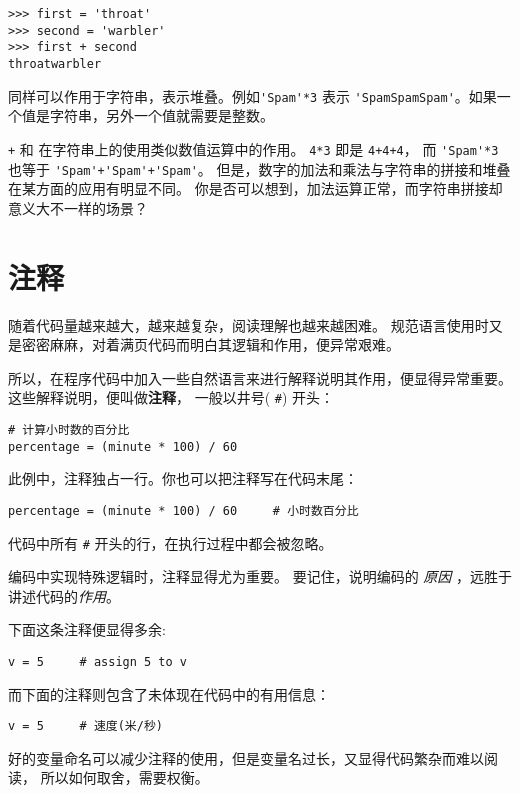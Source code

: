 \documentclass[10pt]{book}
\begin{document}
\begin{verbatim}
>>> first = 'throat'
>>> second = 'warbler'
>>> first + second
throatwarbler
\end{verbatim}
%
 {\tt *} 同样可以作用于字符串，表示堆叠。例如\verb"'Spam'*3" 表示
\verb"'SpamSpamSpam'"。如果一个值是字符串，另外一个值就需要是整数。

{\tt +} 和 {\tt *}在字符串上的使用类似数值运算中的作用。
 {\tt 4*3} 即是 {\tt 4+4+4}，
而 \verb"'Spam'*3"  也等于 \verb"'Spam'+'Spam'+'Spam'"。
但是，数字的加法和乘法与字符串的拼接和堆叠在某方面的应用有明显不同。
你是否可以想到，加法运算正常，而字符串拼接却意义大不一样的场景？



\section{注释}

随着代码量越来越大，越来越复杂，阅读理解也越来越困难。
规范语言使用时又是密密麻麻，对着满页代码而明白其逻辑和作用，便异常艰难。

所以，在程序代码中加入一些自然语言来进行解释说明其作用，便显得异常重要。
这些解释说明，便叫做{\bf 注释}， 一般以井号( \verb"#") 开头：

\begin{verbatim}
# 计算小时数的百分比
percentage = (minute * 100) / 60
\end{verbatim}
%
此例中，注释独占一行。你也可以把注释写在代码末尾：

\begin{verbatim}
percentage = (minute * 100) / 60     # 小时数百分比
\end{verbatim}
%
代码中所有  {\tt \#} 开头的行，在执行过程中都会被忽略。

编码中实现特殊逻辑时，注释显得尤为重要。
要记住，说明编码的 {\em 原因} ，远胜于讲述代码的{\em 作用}。

下面这条注释便显得多余:

\begin{verbatim}
v = 5     # assign 5 to v
\end{verbatim}
%

而下面的注释则包含了未体现在代码中的有用信息：

\begin{verbatim}
v = 5     # 速度(米/秒) 
\end{verbatim}
%
好的变量命名可以减少注释的使用，但是变量名过长，又显得代码繁杂而难以阅读，
所以如何取舍，需要权衡。
\end{document}
